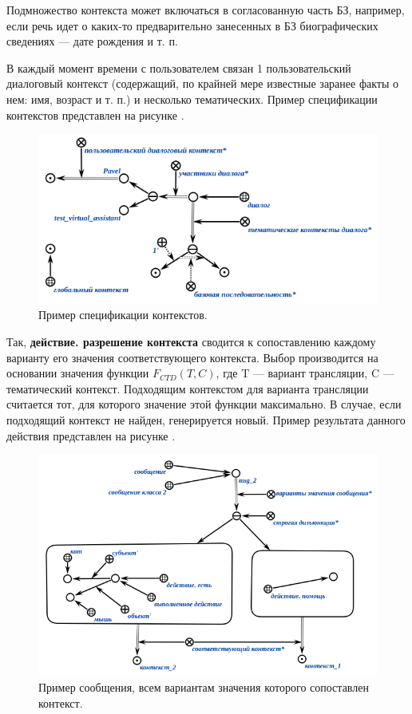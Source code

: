 {\begin{SCn}
\end{SCn}

Подмножество контекста может включаться в согласованную часть БЗ, например, если речь идет о каких-то предварительно занесенных в БЗ биографических сведениях --- дате рождения и т. п.

В каждый момент времени с пользователем связан 1 пользовательский диалоговый контекст (содержащий, по крайней мере известные заранее факты о нем: имя, возраст и т. п.) и несколько тематических.
Пример спецификации контекстов представлен на рисунке \textit{}.

\begin{figure}[h]
    \centering
    \includegraphics[scale=0.8]{images/part4/chapter_nl_interfaces/user_context}
    \caption{Пример спецификации контекстов.}
    \label{fig:user_context}
\end{figure}

Так, \textbf{действие. разрешение контекста} сводится к сопоставлению каждому варианту его значения соответствующего контекста.
Выбор производится на основании значения функции $F_{CTD}(T, C)$, где T --- вариант трансляции, C --- тематический контекст.
Подходящим контекстом для варианта трансляции считается тот, для которого значение этой функции максимально.
В случае, если подходящий контекст не найден, генерируется новый.
Пример результата данного действия представлен на рисунке \textit{}.

\begin{figure}[h]
    \centering
    \includegraphics[scale=0.8]{images/part4/chapter_nl_interfaces/relevant_contexts}
    \caption{Пример сообщения, всем вариантам значения которого сопоставлен контекст.}
    \label{fig:relevant_contexts}
\end{figure}

}
